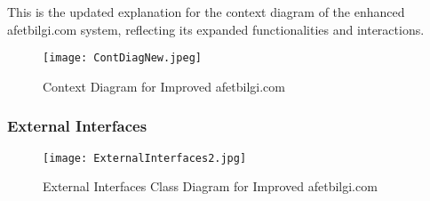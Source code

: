 \documentclass[12pt, letterpaper]{article}
\begin{document}
This is the updated explanation for the context diagram of the enhanced afetbilgi.com system, reflecting its expanded functionalities and interactions.

\begin{figure}[H]
\centering
\texttt{[image: ContDiagNew.jpeg]}
\caption{Context Diagram for Improved afetbilgi.com}
\end{figure}

\subsubsection{External Interfaces}

\begin{figure}[H]
\centering
\texttt{[image: ExternalInterfaces2.jpg]}
\caption{External Interfaces Class Diagram for Improved afetbilgi.com}
\end{figure}
\end{document}
